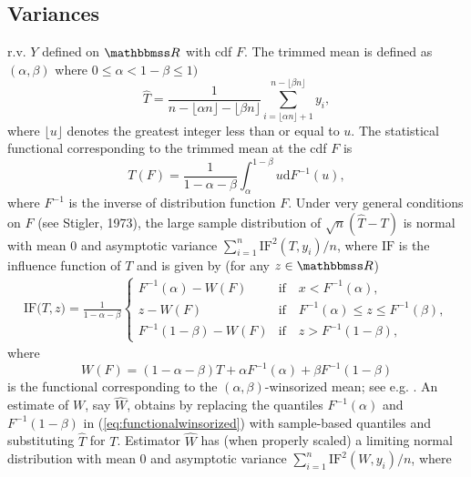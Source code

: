 \documentclass[a4paper,oneside,11pt,DIV=12]{scrartcl}
\newcommand{\R}{{\mathbbmss R}}         %
\theoremstyle{remark}
\begin{document}
\subsection{Variances}
r.v. $Y$ defined on $\R$ with cdf $F$. The trimmed mean is defined as $(\alpha,\beta)$ where $0 \leq \alpha < 1- \beta \leq 1)$
\begin{equation*}
   \widehat{T} = \frac{1}{n - \lfloor \alpha n\rfloor - \lfloor \beta n\rfloor}\sum_{i= \lfloor \alpha n \rfloor + 1}^{n - \lfloor \beta n \rfloor} y_i,
\end{equation*}
\noindent where $\lfloor u \rfloor$ denotes the greatest integer less than or equal to $u$. The statistical functional corresponding to the trimmed mean at the cdf $F$ is
\begin{equation*}
   T(F) = \frac{1}{1 - \alpha - \beta} \int_{\alpha}^{1-\beta} u \mathrm{d} F^{-1}(u),
\end{equation*}
\noindent where $F^{-1}$ is the inverse of distribution function $F$. Under very general conditions on $F$ (see Stigler, 1973), the large sample distribution of $\sqrt{n}(\widehat{T} - T)$ is normal with mean 0 and asymptotic variance $\sum_{i=1}^n \mathrm{IF}^2(T,y_i)/n$, where $\mathrm{IF}$ is the influence function of $T$ and is given by (for any $z \in \R$)
\begin{align*}
   \mathrm{IF}\big(T, z\big) = \frac{1}{1-\alpha - \beta}
   \begin{cases}
      F^{-1}(\alpha) - W(F) & \text{if} \quad x < F^{-1}(\alpha),\\
      z - W(F) & \text{if} \quad F^{-1}(\alpha) \leq z \leq F^{-1}(\beta),\\
      F^{-1}(1-\beta) - W(F) & \text{if} \quad z > F^{-1}(1-\beta),
   \end{cases}
\end{align*}
\noindent where
\begin{equation}\label{eq:functionalwinsorized}
   W(F) = (1 - \alpha -\beta)T + \alpha F^{-1}(\alpha) + \beta F^{-1}(1-\beta)
\end{equation}
\noindent is the functional corresponding to the $(\alpha,\beta)$-winsorized mean; see e.g. \citet[][p. 58]{huber_1981}. An estimate of $W$, say $\widehat{W}$, obtains by replacing the quantiles $F^{-1}(\alpha)$ and $F^{-1}(1-\beta)$ in (\ref{eq:functionalwinsorized}) with sample-based quantiles and substituting $\widehat{T}$ for $T$. Estimator $\widehat{W}$ has (when properly scaled) a limiting normal distribution with mean 0 and asymptotic variance $\sum_{i=1}^n \mathrm{IF}^2(W,y_i) / n$, where \citep[see e.g.][58--59]{huber_1981}
\end{document}
